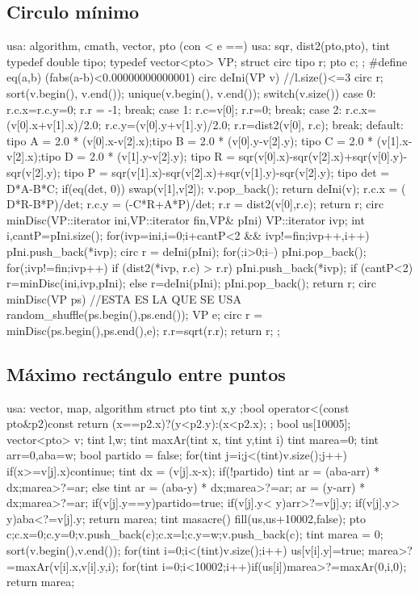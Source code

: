 \documentclass[10pt,landscape,twocolumn,a4paper,notitlepage]{article}
\begin{document}
\subsection{Circulo m\'inimo}
\begin{code}
usa: algorithm, cmath, vector, pto (con < e ==)
usa: sqr, dist2(pto,pto), tint
typedef double tipo;
typedef vector<pto> VP;
struct circ { tipo r; pto c; };
#define eq(a,b) (fabs(a-b)<0.00000000000001)
circ deIni(VP v){ //l.size()<=3
  circ r;  sort(v.begin(), v.end()); unique(v.begin(), v.end());
  switch(v.size()) {
    case 0: r.c.x=r.c.y=0; r.r = -1; break;
    case 1: r.c=v[0]; r.r=0; break;
    case 2: r.c.x=(v[0].x+v[1].x)/2.0;
        r.c.y=(v[0].y+v[1].y)/2.0;
        r.r=dist2(v[0], r.c); break;
    default: {
      tipo A = 2.0 * (v[0].x-v[2].x);tipo B = 2.0 * (v[0].y-v[2].y);
      tipo C = 2.0 * (v[1].x-v[2].x);tipo D = 2.0 * (v[1].y-v[2].y);
      tipo R = sqr(v[0].x)-sqr(v[2].x)+sqr(v[0].y)-sqr(v[2].y);
      tipo P = sqr(v[1].x)-sqr(v[2].x)+sqr(v[1].y)-sqr(v[2].y);
      tipo det = D*A-B*C;
      if(eq(det, 0)) {swap(v[1],v[2]); v.pop_back(); return deIni(v);}
      r.c.x = ( D*R-B*P)/det;
      r.c.y = (-C*R+A*P)/det;
      r.r = dist2(v[0],r.c);
    }
  }
  return r;
}
circ minDisc(VP::iterator ini,VP::iterator fin,VP& pIni){
  VP::iterator ivp;
  int i,cantP=pIni.size();
  for(ivp=ini,i=0;i+cantP<2 && ivp!=fin;ivp++,i++) pIni.push_back(*ivp);
  circ r = deIni(pIni);
  for(;i>0;i--) pIni.pop_back();
  for(;ivp!=fin;ivp++) if (dist2(*ivp, r.c) > r.r){
    pIni.push_back(*ivp);
    if (cantP<2) r=minDisc(ini,ivp,pIni);
    else r=deIni(pIni);
    pIni.pop_back();
  }
  return r;
}
circ minDisc(VP ps){ //ESTA ES LA QUE SE USA
  random_shuffle(ps.begin(),ps.end()); VP e;
  circ r = minDisc(ps.begin(),ps.end(),e);
  r.r=sqrt(r.r); return r;
};
\end{code}
\subsection{M\'aximo rect\'angulo entre puntos}
\begin{code}
usa: vector, map, algorithm
struct pto {
  tint x,y ;bool operator<(const pto&p2)const{
    return (x==p2.x)?(y<p2.y):(x<p2.x);
  }
};
bool us[10005];
vector<pto> v;
tint l,w;
tint maxAr(tint x, tint y,tint i){
  tint marea=0;
  tint arr=0,aba=w;
  bool partido = false;
  for(tint j=i;j<(tint)v.size();j++){
    if(x>=v[j].x)continue;
    tint dx = (v[j].x-x);
    if(!partido){
      tint ar = (aba-arr) * dx;marea>?=ar;
    } else {
      tint ar = (aba-y) * dx;marea>?=ar;
      ar = (y-arr) * dx;marea>?=ar;
    }
    if(v[j].y==y)partido=true;
    if(v[j].y< y)arr>?=v[j].y;
    if(v[j].y> y)aba<?=v[j].y;
  }
  return marea;
}
tint masacre(){
  fill(us,us+10002,false);
  pto c;c.x=0;c.y=0;v.push_back(c);c.x=l;c.y=w;v.push_back(c);
  tint marea = 0;
  sort(v.begin(),v.end());
  for(tint i=0;i<(tint)v.size();i++){
    us[v[i].y]=true;
    marea>?=maxAr(v[i].x,v[i].y,i);
  }
  for(tint i=0;i<10002;i++)if(us[i])marea>?=maxAr(0,i,0);
  return marea;
}
\end{code}
\end{document}
